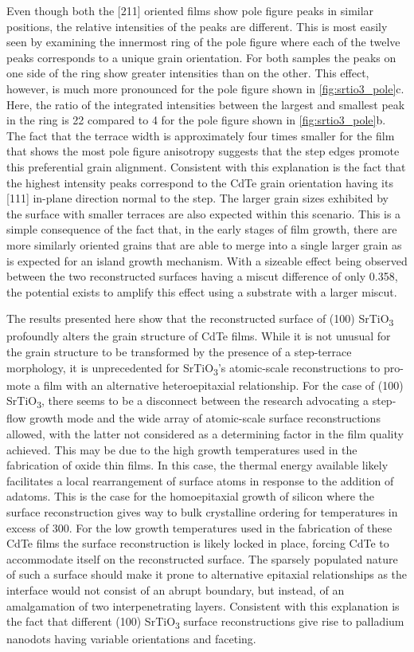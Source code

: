 Even though both the [211] oriented films show pole figure peaks in similar positions, the relative intensities of the peaks are different.
This is most easily seen by examining the innermost ring of the pole figure where each of the twelve peaks corresponds to a unique grain orientation.
For both samples the peaks on one side of the ring show greater intensities than on the other.
This effect, however, is much more pronounced for the pole figure shown in \cref{fig:srtio3_pole}c.
Here, the ratio of the integrated intensities between the largest and smallest peak in the ring is 22 compared to 4 for the pole figure shown in \cref{fig:srtio3_pole}b.
The fact that the terrace width is approximately four times smaller for the film that shows the most pole figure anisotropy suggests that the step edges promote this preferential grain alignment.
Consistent with this explanation is the fact that the highest intensity peaks correspond to the CdTe grain orientation having its [111] in-plane direction normal to the step.
The larger grain sizes exhibited by the surface with smaller terraces are also expected within this scenario.
This is a simple consequence of the fact that, in the early stages of film growth, there are more similarly oriented grains that are able to merge into a single larger grain as is expected for an island growth mechanism.
With a sizeable effect being observed between the two reconstructed surfaces having a miscut difference of only 0.358\degree{}, the potential exists to amplify this effect using a substrate with a larger miscut.

The results presented here show that the reconstructed surface of (100) SrTiO\textsubscript{3} profoundly alters the grain structure of CdTe films.
While it is not unusual for the grain structure to be transformed by the presence of a step-terrace morphology, it is unprecedented for SrTiO\textsubscript{3}'s atomic-scale reconstructions to pro- mote a film with an alternative heteroepitaxial relationship.
For the case of (100) SrTiO\textsubscript{3}, there seems to be a disconnect between the research advocating a step-flow growth mode and the wide array of atomic-scale surface reconstructions allowed, with the latter not considered as a determining factor in the film quality achieved.
This may be due to the high growth temperatures used in the fabrication of oxide thin films.
In this case, the thermal energy available likely facilitates a local rearrangement of surface atoms in response to the addition of adatoms.
This is the case for the homoepitaxial growth of silicon where the surface reconstruction gives way to bulk crystalline ordering for temperatures in excess of 300\celsius{}\cite{Gossmann1985}.
For the low growth temperatures used in the fabrication of these CdTe films the surface reconstruction is likely locked in place, forcing CdTe to accommodate itself on the reconstructed surface.
The sparsely populated nature of such a surface should make it prone to alternative epitaxial relationships as the interface would not consist of an abrupt boundary, but instead, of an amalgamation of two interpenetrating layers.
Consistent with this explanation is the fact that different (100) SrTiO\textsubscript{3} surface reconstructions give rise to palladium nanodots having variable orientations and faceting\cite{Silly2005b}.
